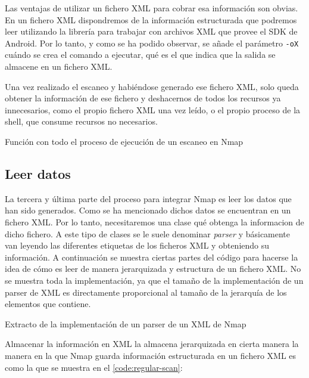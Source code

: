 Las ventajas de utilizar un fichero XML para cobrar esa información son obvias. En un fichero XML dispondremos de la información estructurada que podremos leer utilizando la librería para trabajar con archivos XML que provee el SDK de Android. Por lo tanto, y como se ha podido observar, se añade el parámetro \texttt{-oX} cuándo se crea el comando a ejecutar, qué es el que indica que la salida se almacene en un fichero XML.

Una vez realizado el escaneo y habiéndose generado ese fichero XML, solo queda obtener la información de ese fichero y deshacernos de todos los recursos ya innecesarios, como el propio fichero XML una vez leído, o el propio proceso de la shell, que consume recursos no necesarios.

\begin{code}
	\caption{Función con todo el proceso de ejecución de un escaneo en Nmap}
	\label{code:runScan}
	
\end{code}

\subsection{Leer datos}

La tercera y última parte del proceso para integrar Nmap es leer los datos que han sido generados. Como se ha mencionado dichos datos se encuentran en un fichero XML. Por lo tanto, necesitaremos una clase qué obtenga la informacion de dicho fichero. A este tipo de clases se le suele denominar \textit{parser} y básicamente van leyendo las diferentes etiquetas de los ficheros XML y obteniendo su información. A continuación se muestra ciertas partes del código para hacerse la idea de cómo es leer de manera jerarquizada y estructura de un fichero XML. No se muestra toda la implementación, ya que el tamaño de la implementación de un parser de XML es directamente proporcional al tamaño de la jerarquía de los elementos que contiene.

\begin{code}
	\caption{Extracto de la implementación de un parser de un XML de Nmap}
	
	\label{code:nmapParser}
\end{code}

Almacenar la información en XML la almacena jerarquizada en cierta manera la manera en la que Nmap guarda información estructurada en un fichero XML es como la que se muestra en el \autoref{code:regular-scan}:

